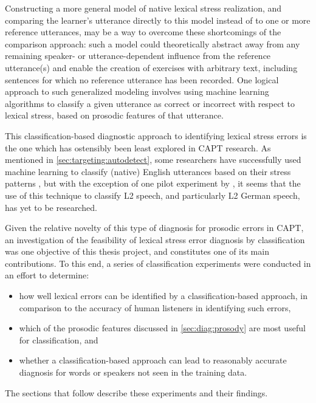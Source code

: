 	Constructing a more general model of native lexical stress realization, and comparing the learner's utterance directly to this model instead of to one or more reference utterances, 
	may be a way to overcome these shortcomings of the comparison approach:
	such a model could theoretically
	abstract away from any remaining speaker- or utterance-dependent influence from the reference utterance(s)
	and
	enable the creation of exercises with arbitrary text, including sentences for which no reference utterance has been recorded. 
	One logical approach to such generalized modeling involves using machine learning algorithms to classify a given utterance as correct or incorrect with respect to lexical stress, based on prosodic features of that utterance.
	
	
	
	This classification-based diagnostic approach to identifying lexical stress errors is the one which has ostensibly been least explored in CAPT research. As mentioned in \cref{sec:targeting:autodetect}, 
	some researchers have successfully used machine learning to classify (native) English utterances based on their stress patterns \citep{Shahin2012a,Kim2011}, but with the exception of one pilot experiment by \citeauthor{Kim2011}, it seems that the use of this technique to classify L2 speech, and particularly L2 German speech, has yet to be researched.
	  
	  
	 
	 
	 Given the relative novelty of this type of diagnosis for prosodic errors in CAPT, an investigation of the feasibility of lexical stress error diagnosis by classification was one objective of this thesis project, and constitutes one of its main contributions. To this end, a series of classification experiments were conducted in an effort to determine:
	 \begin{itemize}[topsep=-.5em]
	 \item how well lexical errors can be identified by a classification-based approach, in comparison to the accuracy of human listeners in identifying such errors, 
	 \item which of the prosodic features discussed in \cref{sec:diag:prosody} are most useful for classification, and
	 \item whether a classification-based approach can lead to reasonably accurate diagnosis for words or speakers not seen in the training data.
	 \end{itemize}
	 The sections that follow describe these experiments and their findings. 
	 
